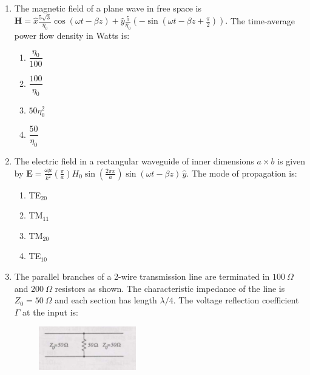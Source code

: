 \documentclass[journal,12pt,onecolumn]{IEEEtran}
\theoremstyle{remark}
\begin{document}
\begin{enumerate}
\item The magnetic field of a plane wave in free space is
$
\mathbf{H} = \hat{x} \frac{5\sqrt{3}}{\eta_0} \cos(\omega t - \beta z)
+ \hat{y} \frac{5}{\eta_0} \left(-\sin(\omega t - \beta z + \frac{\pi}{2})\right).
$
The time-average power flow density in Watts is: 
\hfill{}

\begin{multicols}{4}
\begin{enumerate}
  \item $\dfrac{\eta_0}{100}$
  \item $\dfrac{100}{\eta_0}$
  \item $50\eta_0^2$
  \item $\dfrac{50}{\eta_0}$
\end{enumerate}
\end{multicols}

\item The electric field in a rectangular waveguide of inner dimensions $a\times b$ is given by
$
\mathbf{E} = \frac{\omega\mu}{k^2} \left(\frac{\pi}{a}\right) H_0 \sin\left(\frac{2\pi x}{a}\right) \sin(\omega t - \beta z)\,\hat{y}.
$
The mode of propagation is: 
\hfill{}
\begin{multicols}{4}
\begin{enumerate}
  \item TE$_{20}$
  \item TM$_{11}$
  \item TM$_{20}$
  \item TE$_{10}$
\end{enumerate}
\end{multicols}

\item The parallel branches of a 2-wire transmission line are terminated in $100~\Omega$ and $200~\Omega$ resistors as shown. The characteristic impedance of the line is $Z_0=50~\Omega$ and each section has length $\lambda/4$. The voltage reflection coefficient $\Gamma$ at the input is: 

\begin{figure}[ht!]
    \centering
    \includegraphics[width=0.4\textwidth]{Q67.jpg}
    \caption{}
    \label{fig:Q52.jpg}
\end{figure}
\hfill{}


\end{enumerate}
\end{document}
